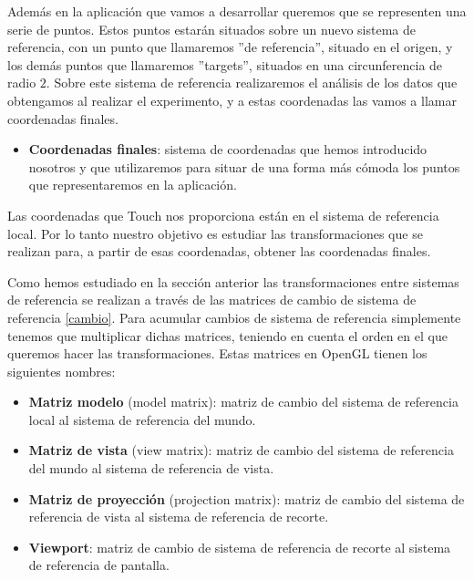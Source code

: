 \documentclass[a4paper,11pt, oneside]{book}
\begin{document}
Además en la aplicación que vamos a desarrollar queremos que se representen una serie de puntos. Estos puntos estarán situados sobre un nuevo sistema de referencia, con un punto que llamaremos ''de referencia'', situado en el origen, y los demás puntos que llamaremos ''targets'', situados en una circunferencia de radio $2$. Sobre este sistema de referencia realizaremos el análisis de los datos que obtengamos al realizar el experimento, y a estas coordenadas las vamos a llamar coordenadas finales.

\begin{itemize}
	\item \textbf{Coordenadas finales}: sistema de coordenadas que hemos introducido nosotros y que utilizaremos para situar de una forma más cómoda los puntos que representaremos en la aplicación.
\end{itemize}



Las coordenadas que Touch nos proporciona están en el sistema de referencia local. Por lo tanto nuestro objetivo es estudiar las transformaciones que se realizan para, a partir de esas coordenadas, obtener las coordenadas finales.

Como hemos estudiado en la sección anterior las transformaciones entre sistemas de referencia se realizan a través de las matrices de cambio de sistema de referencia \ref{cambio}. Para acumular cambios de sistema de referencia simplemente tenemos que multiplicar dichas matrices, teniendo en cuenta el orden en el que queremos hacer las transformaciones. Estas matrices en OpenGL tienen los siguientes nombres:

\begin{itemize}
	\item \textbf{Matriz modelo} (model matrix): matriz de cambio del sistema de referencia local al sistema de referencia del mundo.
	\item \textbf{Matriz de vista} (view matrix): matriz de cambio del sistema de referencia del mundo al sistema de referencia de vista.
	\item \textbf{Matriz de proyección} (projection matrix): matriz de cambio del sistema de referencia de vista al sistema de referencia de recorte.
	\item \textbf{Viewport}: matriz de cambio de sistema de referencia de recorte al sistema de referencia de pantalla.
\end{itemize}
\end{document}

